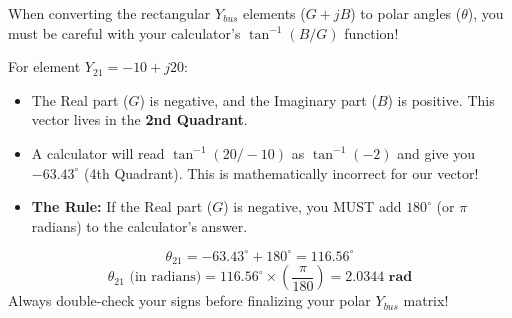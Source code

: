 \documentclass[11pt]{article}
\begin{document}
\newpage
\begin{examtrap}
When converting the rectangular $Y_{bus}$ elements ($G + jB$) to polar angles ($\theta$), you must be careful with your calculator's $\tan^{-1}(B/G)$ function!

For element $Y_{21} = -10 + j20$:
\begin{itemize}
    \item The Real part ($G$) is negative, and the Imaginary part ($B$) is positive. This vector lives in the \textbf{2nd Quadrant}.
    \item A calculator will read $\tan^{-1}(20/-10)$ as $\tan^{-1}(-2)$ and give you $-63.43^\circ$ (4th Quadrant). This is mathematically incorrect for our vector!
    \item \textbf{The Rule:} If the Real part ($G$) is negative, you MUST add $180^\circ$ (or $\pi$ radians) to the calculator's answer.
\end{itemize}
$$ \theta_{21} = -63.43^\circ + 180^\circ = 116.56^\circ $$
$$ \theta_{21} \text{ (in radians)} = 116.56^\circ \times \left( \frac{\pi}{180} \right) = \mathbf{2.0344 \text{ rad}} $$
Always double-check your signs before finalizing your polar $Y_{bus}$ matrix!
\end{examtrap}
\end{document}
